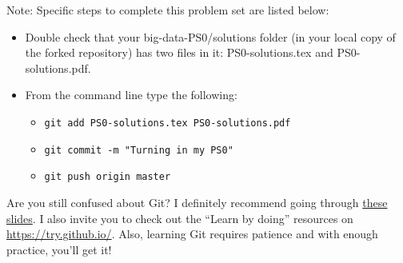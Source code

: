 \documentclass[12pt,english]{exam}
\begin{document}
Note: Specific steps to complete this problem set are listed below:
\begin{itemize}
\item Double check that your big-data-PS0/solutions folder (in your local copy of the forked repository) has two files in it: PS0-solutions.tex and PS0-solutions.pdf.
\item From the command line type the following:
    \begin{itemize}
    \item \texttt{git add PS0-solutions.tex PS0-solutions.pdf}
    \item \texttt{git commit -m "Turning in my PS0"}
    \item \texttt{git push origin master}
    \end{itemize}
\end{itemize}

Are you still confused about Git? I definitely recommend going through \href{https://raw.githack.com/uo-ec607/lectures/master/02-git/02-Git.html}{these slides}. I also invite you to check out the ``Learn by doing'' resources on \url{https://try.github.io/}. Also, learning Git requires patience and with enough practice, you'll get it!
\end{document}

